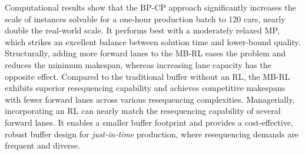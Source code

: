 \documentclass[12pt]{article}
\begin{document}
Computational results show that the BP-CP approach significantly increases the scale of instances solvable for a one-hour production batch to 120 cars, nearly double the real‑world scale. It performs best with a moderately relaxed MP, which strikes an excellent balance between solution time and lower-bound quality. Structurally, adding more forward lanes to the MB-RL eases the problem and reduces the minimum makespan, whereas increasing lane capacity has the opposite effect. Compared to the traditional buffer without an RL, the MB-RL exhibits superior resequencing capability and achieves competitive makespans with fewer forward lanes across various resequencing complexities. Managerially, incorporating an RL can nearly match the resequencing capability of several forward lanes. It enables a smaller buffer footprint and provides a cost-effective, robust buffer design for \textit{just-in-time} production, where resequencing demands are frequent and diverse.



\end{document}
